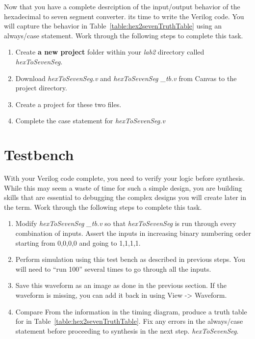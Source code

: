 Now that you have a complete desrciption of the input/output behavior 
of the hexadecimal to seven segment converter. its time to write the
Verilog code.  You will capture the behavior in Table~\ref{table:hex2sevenTruthTable}
using an always/case statement.  Work through the following steps to complete this task.
\begin{enumerate}
\item
  Create \textbf{a new project} folder within your \emph{lab2} directory
  called \emph{hexToSevenSeg.}
\item
  Download \emph{hexToSevenSeg.v} and \emph{hexToSevenSeg \_tb.v} from
  Canvas to the project directory.
\item
  Create a project for these two files.
\item
  \protect\hypertarget{Hex2Seven_Verilog}{}{}Complete the case statement
  for \emph{hexToSevenSeg.v}
  \end{enumerate}
  
  
 \section{Testbench}
 With your Verilog code complete, you need to verify your logic before 
 synthesis.  While this may seem a waste of time for such a simple design,
 you are building skills that are essential to debugging the complex 
 designs you will create later in the term.  Work through the following steps
 to complete this task.
 
 \begin{enumerate}
\item
  Modify \emph{hexToSevenSeg \_tb.v} so that \emph{hexToSevenSeg} is run
  through every combination of inputs. Assert the inputs in increasing
  binary numbering order starting from 0,0,0,0 and going to 1,1,1,1.
\item
  Perform simulation using this test bench as described in previous
  steps. You will need to ``run 100'' several times to go through all
  the inputs.
\item
  \protect\hypertarget{Hex2Seven_Waveform}{}{}Save this waveform as an
  image as done in the previous section. If the waveform is missing, you
  can add it back in using View -\textgreater{} Waveform.
\item
  Compare From the information in the timing diagram, produce a truth table for
  in Table~\ref{table:hex2sevenTruthTable}.  Fix any errors in the always/case statement
  before proceeding to synthesis in the next step.
  \emph{hexToSevenSeg}.
 \end{enumerate} 
  
